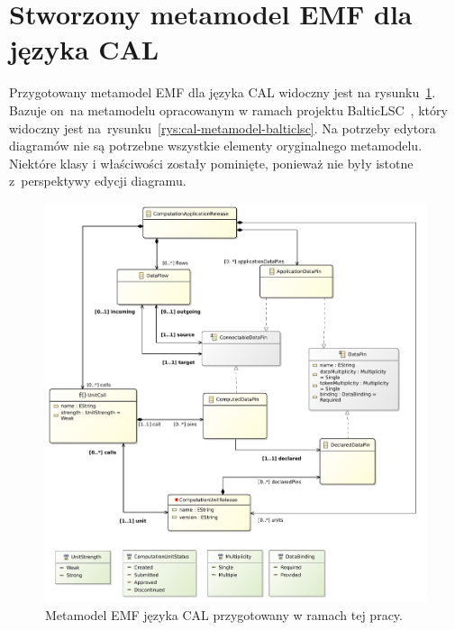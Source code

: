\section{Stworzony metamodel EMF dla języka CAL}

Przygotowany metamodel \gls{EMF} dla języka \gls{CAL} widoczny jest na
rysunku~\ref{rys:cal-emf-metamodel}. Bazuje on~na metamodelu
opracowanym w ramach projektu BalticLSC~\cite{cal-metamodel}, który widoczny
jest na~rysunku~\ref{rys:cal-metamodel-balticlsc}.
Na potrzeby edytora diagramów nie są potrzebne wszystkie elementy oryginalnego
metamodelu. Niektóre klasy i właściwości zostały pominięte, ponieważ nie były
istotne z~perspektywy edycji diagramu.

\begin{figure}[!hb]
	\centering

	\includegraphics[width=0.92\linewidth]{./images/cal-emf-metamodel.pdf}
	\caption{Metamodel EMF języka CAL przygotowany w ramach tej
		pracy.}\label{rys:cal-emf-metamodel}
\end{figure}

